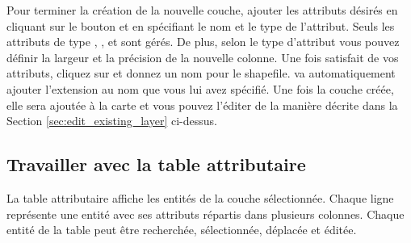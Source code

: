 Pour terminer la création de la nouvelle couche, ajouter les attributs désirés en cliquant sur le bouton  et en spécifiant le nom et le type de l'attribut. Seuls les attributs de type , , et  sont gérés. De plus, selon le type d'attribut vous pouvez définir la largeur et la précision de la nouvelle colonne. Une fois satisfait de vos attributs, cliquez sur  et donnez un nom pour le shapefile. \qg va automatiquement ajouter l'extension  au nom que vous lui avez spécifié. Une fois la couche créée, elle sera ajoutée à la carte et vous pouvez l'éditer de la manière décrite dans la Section \ref{sec:edit_existing_layer} ci-dessus.

\subsection{Travailler avec la table attributaire}\label{sec:attribute table}

La table attributaire affiche les entités de la couche sélectionnée. Chaque ligne représente une entité avec ses attributs répartis dans  plusieurs colonnes. Chaque entité de la table peut être recherchée, sélectionnée, déplacée et éditée.

